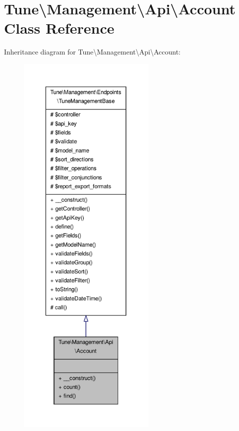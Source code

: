 \hypertarget{classTune_1_1Management_1_1Api_1_1Account}{\section{Tune\textbackslash{}Management\textbackslash{}Api\textbackslash{}Account Class Reference}
\label{classTune_1_1Management_1_1Api_1_1Account}
}


Inheritance diagram for Tune\textbackslash{}Management\textbackslash{}Api\textbackslash{}Account\-:
\nopagebreak
\begin{figure}[H]
\begin{center}
\leavevmode
\includegraphics[height=550pt]{classTune_1_1Management_1_1Api_1_1Account__inherit__graph}
\end{center}
\end{figure}


